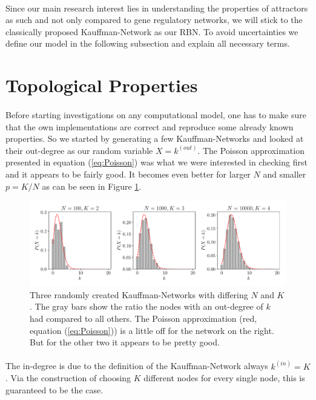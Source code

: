 \paragraph*{}
Since our main research interest lies in understanding the properties of attractors as such and not only compared to gene regulatory networks, we will stick to the classically proposed Kauffman-Network as our RBN. To avoid uncertainties we define our model in the following subsection and explain all necessary terms.


\section{Topological Properties}

\paragraph{}
Before starting investigations on any computational model, one has to make sure that the own implementations are correct and reproduce some already known properties. So we started by generating a few Kauffman-Networks and looked at their out-degree as our random variable $X=k^{(out)}$. The Poisson approximation presented in equation (\ref{eq:Poisson}) was what we were interested in checking first and it appears to be fairly good. It becomes even better for larger $N$ and smaller $ p = K/N $ as can be seen in Figure \ref{fig:Poisson}. 

\begin{figure}
	\includegraphics[width=\textwidth]{Plots/poisson_distributed}
	\caption{Three randomly created Kauffman-Networks with differing $N$ and $K$. The gray bars show the ratio the nodes with an out-degree of $k$ had compared to all others. The Poisson approximation (red, equation (\ref{eq:Poisson})) is a little off for the network on the right. But for the other two it appears to be pretty good.}
	\label{fig:Poisson}
\end{figure}

\paragraph*{}
The in-degree is due to the definition of the Kauffman-Network always $k^{(in)}=K$. Via the construction of choosing $K$ different nodes for every single node, this is guaranteed to be the case. 

